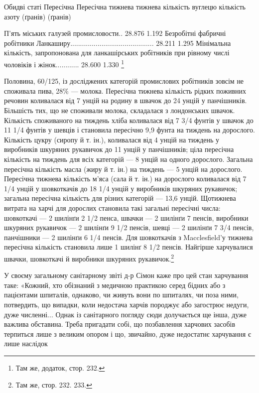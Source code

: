 \parcont{}  %
Обидві статі                                                        Пересічна
       Пересічна
                                                                                тижнева
                    тижнева
                                                                                кількість вуглецю
            кількість азоту
                                                                                (ґранів)
                      (ґранів)

П’ять міських галузей промисловости..     28.876                                      1.192
Безробітні фабричні робітники
Ланкаширу...........................................     28.211
1.295
Мінімальна кількість, запропонована
для ланкашірських робітників при
рівному числі чоловіків і жінок............      28.600                                      1.330
\footnote{
Там же, додаток, стор. 232.
}

Половина, 60/125, із досліджених категорій промислових робітників
зовсім не споживала пива, 28\% — молока. Пересічна
тижнева кількість рідких поживних речовин коливалася від
7 унцій на родину в швачок до 24 унцій у панчішників. Більшість
тих, що не споживали молока, складалася з лондонських
швачок. Кількість споживаного на тиждень хліба коливалася
від 7 3/4 фунтів у швачок до 11 1/4 фунтів у шевців і становила пересічно
9,9 фунта на тиждень на дорослого. Кількість цукру (сиропу
й т. ін.), коливалася від 4 унцій на тиждень у виробників
шкуряних рукавичок до 11 унцій у панчішників; ціла пересічна
кількість на тиждень для всіх категорій — 8 унцій на одного
дорослого. Загальна пересічна кількість масла (жиру й т. ін.)
на тиждень — 5 унцій на дорослого. Пересічна тижнева кількість
м’яса (сала й т. ін.) на дорослого коливалася від 7 1/4 унцій у шовкоткачів
до 18 1/4 унцій у виробників шкуряних рукавичок;
загальна пересічна кількість для різних категорій — 13,6 унцій.
Щотижнева витрата на харчі для дорослих становила такі загальні
пересічні числа: шовкоткачі — 2 шилінґи 2 1/2 пенса,
швачки — 2 шилінґи 7 пенсів, виробники шкуряних рукавичок
— 2 шилінґи 9 1/2 пенсів, шевці — 2 шилінґи 7 3/4 пенсів,
панчішники — 2 шилінґи 6 1/4 пенсів. Для шовкоткачів з Macclesfield’у
тижнева пересічна кількість становила лише 1 шилінґ
8 1/2 пенсів. Найгірше харчувалися швачки, шовкоткачі й виробники
шкуряних рукавичок.\footnote{
Там же, стор. 232. 233.
}

У своєму загальному санітарному звіті д-р Сімон каже про
цей стан харчування таке: «Кожний, хто обізнаний з медичною
практикою серед бідних або з пацієнтами шпиталів, однаково,
чи живуть вони по шпиталях, чи поза ними, потвердить, що випадки,
коли недостача харчів породжує або загострює недуги,
дуже численні... Однак із санітарного погляду сюди долучається
ще інша, дуже важлива обставина. Треба пригадати собі, що
позбавлення харчових засобів терпиться лише з великим опором
і що, звичайно, дуже недостатнє харчування є лише наслідок
\parbreak{}  %
